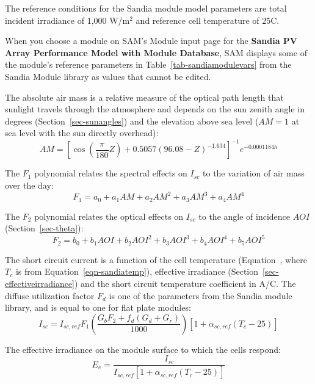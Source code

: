 \documentclass[12pt,letterpaper]{article}
\newcommand\AOI{\ensuremath{\mathit{AOI}}}
\begin{document}
The reference conditions for the Sandia module model parameters are total incident irradiance of 1,000 W/m$^2$ and reference cell temperature of 25\degree C. 

When you choose a module on SAM's Module input page for the \textbf{Sandia PV Array Performance Model with Module Database}, SAM displays some of the module's reference parameters in Table~\ref{tab-sandiamodulevars} from the Sandia Module library as values that cannot be edited.

The absolute air mass is a relative measure of the optical path length that sunlight travels through the atmosphere and depends on the sun zenith angle in degrees (Section~\ref{sec-sunangles}) and the elevation above sea level ($AM=1$ at sea level with the sun directly overhead):
\begin{equation}\label{eqn-sandiaam}
AM = \left[ \cos(\frac{\pi}{180} Z ) + 0.5057 (96.08 - Z)^{-1.634} \right]^{-1} e^{-0.0001184 h}
\end{equation}

The $F_1$ polynomial relates the spectral effects on $I_{sc}$ to the variation of air mass over the day:
\begin{equation}
F_1 = a_0 + a_1 AM + a_2 AM^2 + a_3 AM^3 + a_4 AM^4
\end{equation}

The $F_2$ polynomial relates the optical effects on $I_{sc}$ to the angle of incidence $\AOI$ (Section~\ref{sec-theta}):
\begin{equation}
F_2 = b_0 + b_1\AOI
		+ b_2\AOI^2
		+ b_3\AOI^3
		+ b_4\AOI^4
		+ b_5\AOI^5
\end{equation}

The short circuit current is a function of the cell temperature (Equation~, where $T_c$ is from Equation~\ref{eqn-sandiatemp}), effective irradiance (Section~\ref{sec-effectiveirradiance}) and the short circuit temperature coefficient in A/\degree C. The diffuse utilization factor $F_d$ is one of the parameters from the Sandia module library, and is equal to one for flat plate modules:
\begin{equation}
I_{sc} = I_{sc,ref} F_1 \left( \frac{G_b F_2 + f_d (G_d+G_r)}{1000} \right) \left[1+\alpha_{sc,ref} (T_c-25)\right]
\end{equation}

The effective irradiance on the module surface to which the cells respond:
\begin{equation}
E_e = \frac{I_{sc}}{I_{sc,ref} \left[1 + \alpha_{sc,ref} (T_c - 25)\right]}
\end{equation}
\end{document}
